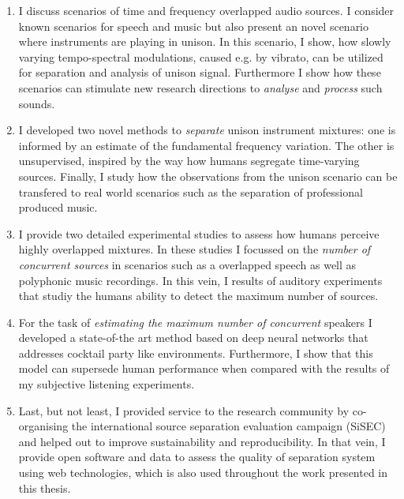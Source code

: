 \begin{enumerate}
\item I discuss scenarios of time and frequency overlapped audio sources.
I consider known scenarios for speech and music but also present an novel scenario where instruments are playing in unison.
In this scenario, I show, how slowly varying tempo-spectral modulations, caused e.g. by vibrato, can be utilized for separation and analysis of unison signal.
Furthermore I show how these scenarios can stimulate new research directions to \emph{analyse} and \emph{process} such sounds.\\

\item I developed two novel methods to \emph{separate} unison instrument mixtures: one is informed by an estimate of the fundamental frequency variation.
The other is unsupervised, inspired by the way how humans segregate time-varying sources.
Finally, I study how the observations from the unison scenario can be transfered to real world scenarios such as the separation of professional produced music.\\

\item I provide two detailed experimental studies to assess how humans perceive highly overlapped mixtures.
In these studies I focussed on the \emph{number of concurrent sources} in scenarios such as a overlapped speech as well as polyphonic music recordings.
In this vein, I results of auditory experiments that studiy the humans ability to detect the maximum number of sources.\\

\item For the task of \emph{estimating the maximum number of concurrent} speakers I developed a state-of-the art method based on deep neural networks that addresses cocktail party like environments.
Furthermore, I show that this model can supersede human performance when compared with the results of my subjective listening experiments.\\

\item Last, but not least, I provided service to the research community by co-organising the international source separation evaluation campaign (SiSEC) and helped out to improve sustainability and reproducibility.
In that vein, I provide open software and data to assess the quality of separation system using web technologies, which is also used throughout the work presented in this thesis.
\end{enumerate}


